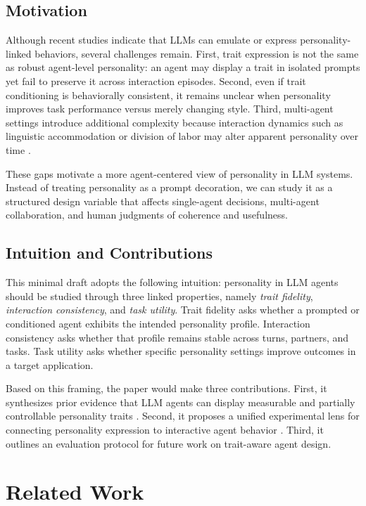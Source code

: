 \documentclass[11pt]{article}
\begin{document}
\subsection{Motivation}
Although recent studies indicate that LLMs can emulate or express personality-linked behaviors, several challenges remain. First, trait expression is not the same as robust agent-level personality: an agent may display a trait in isolated prompts yet fail to preserve it across interaction episodes. Second, even if trait conditioning is behaviorally consistent, it remains unclear when personality improves task performance versus merely changing style. Third, multi-agent settings introduce additional complexity because interaction dynamics such as linguistic accommodation or division of labor may alter apparent personality over time \cite{interaction2024}.

These gaps motivate a more agent-centered view of personality in LLM systems. Instead of treating personality as a prompt decoration, we can study it as a structured design variable that affects single-agent decisions, multi-agent collaboration, and human judgments of coherence and usefulness.

\subsection{Intuition and Contributions}
This minimal draft adopts the following intuition: personality in LLM agents should be studied through three linked properties, namely \emph{trait fidelity}, \emph{interaction consistency}, and \emph{task utility}. Trait fidelity asks whether a prompted or conditioned agent exhibits the intended personality profile. Interaction consistency asks whether that profile remains stable across turns, partners, and tasks. Task utility asks whether specific personality settings improve outcomes in a target application.

Based on this framing, the paper would make three contributions. First, it synthesizes prior evidence that LLM agents can display measurable and partially controllable personality traits \cite{personallm2023,personalitytraitsllm2023}. Second, it proposes a unified experimental lens for connecting personality expression to interactive agent behavior \cite{interaction2024,powerofpersonality2025}. Third, it outlines an evaluation protocol for future work on trait-aware agent design.

\section{Related Work}
\end{document}
